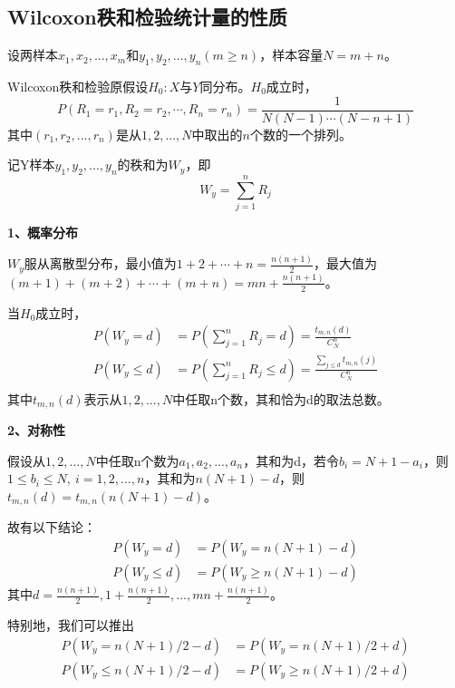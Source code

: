 \documentclass[lang=cn,10pt]{elegantbook}
\begin{document}
\subsection{Wilcoxon秩和检验统计量的性质}
设两样本$x_1,x_2,...,x_{m}$和$y_1,y_2,...,y_n(m \geq n)$，样本容量$N = m + n$。

Wilcoxon秩和检验原假设$H_0:X$与$Y$同分布。$H_0$成立时，
$$
    P(R_1=r_1,R_2=r_2,\cdots,R_n=r_n)=\frac1{N(N-1)\cdots(N-n+1)}
$$
其中$(r_1,r_2,...,r_n)$是从$1,2,...,N$中取出的$n$个数的一个排列。

记Y样本$y_1,y_2,...,y_n$的秩和为$W_y$，即
\begin{equation}
    W_y = \sum_{j=1}^{n}R_{j}
\end{equation}

\textbf{1、概率分布}

$W_y$服从离散型分布，最小值为$1+2+\cdots+n=\frac{n(n+1)}{2}$，最大值为$(m+1)+(m+2)+\cdots+(m+n)=mn+\frac{n(n+1)}{2}$。

\begin{proposition}
    当$H_0$成立时，
    \begin{equation}
        \begin{aligned}
            P(W_y = d)    & = P(\sum_{j=1}^{n}R_{j} = d) =  \frac{t_{m,n}(d)}{C_N^n}                  \\
            P(W_y \leq d) & = P(\sum_{j=1}^{n}R_{j} \leq d) =  \frac{\sum_{j\leq d}t_{m,n}(j)}{C_N^n} \\
        \end{aligned}
    \end{equation}
    其中$t_{m,n}(d)$表示从$1,2,...,N$中任取n个数，其和恰为d的取法总数。
\end{proposition}

\textbf{2、对称性}

假设从$1,2,...,N$中任取n个数为$a_1,a_2,...,a_n$，其和为d，若令$b_i = N+1-a_i$，则$1\leq b_i \leq N,~i = 1,2,...,n$，其和为$n(N+1)-d$，则$t_{m,n}(d) = t_{m,n}(n(N+1)-d)$。

故有以下结论：
\begin{equation}
    \begin{aligned}
        P(W_y=d)          & =P(W_y=n(N+1)-d)          \\
        P(W_y\leqslant d) & =P(W_y\geqslant n(N+1)-d)
    \end{aligned}
\end{equation}
其中$d = \frac{n(n+1)}{2},1+\frac{n(n+1)}{2},...,mn+\frac{n(n+1)}{2}$。

特别地，我们可以推出
\begin{equation}
    \begin{aligned}
        P(W_y=n(N+1)/2-d)          & =P(W_y=n(N+1)/2+d)          \\
        P(W_y\leqslant n(N+1)/2-d) & =P(W_y\geqslant n(N+1)/2+d)
    \end{aligned}
\end{equation}
\end{document}
